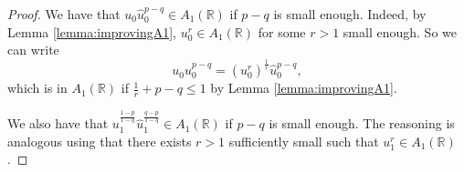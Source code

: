 \documentclass[10pt,a4paper]{amsart}
\newcommand{\R}{\mathbb{R}}
\begin{document}
\begin{proof}
    We have that $u_0\widehat{u}_0^{p-q}\in A_1(\R)$ if  $p-q$ is small enough. Indeed, by Lemma \ref{lemma:improvingA1}, $u_0^{r}\in A_1(\R)$ for some $r>1$ small enough. So we can write
    \[
    u_0\widehat{u}_0^{p-q}
    =
    (u_0^{r})^{\frac{1}{r}}\widehat{u}_{0}^{p-q},
    \]
    which is in $A_1(\R)$ if $\frac{1}{r}+p-q\leq 1$ by Lemma \ref{lemma:improvingA1}. 


    We also have that $u_1^{\frac{1-p}{1-q}}\widehat{u}_{1}^{\frac{q-p}{1-q}}\in A_1(\R)$ if $p-q$ is small enough. The reasoning is analogous using that  there exists $r>1$ sufficiently small such that  $u_1^r\in A_1(\R)$. 
\end{proof}
\end{document}
